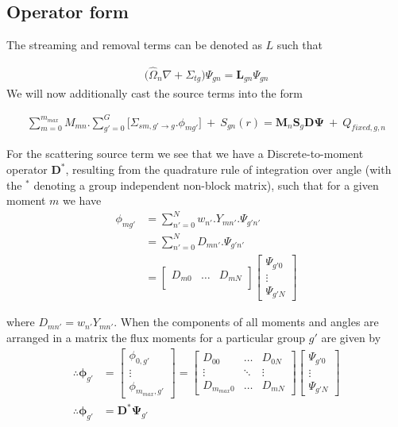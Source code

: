 \documentclass[11pt,letterpaper,titlepage]{article}
\numberwithin{equation}{section}
\begin{document}
\vspace{1.5cm}
\subsection{Operator form}
The streaming and removal terms can be denoted as $L$ such that

\begin{align*}
\biggr(\hat{\Omega}_n\nabla +\Sigma_{tg} \biggr)  \Psi_{gn}  = \mathbf{L}_{gn}\Psi_{gn} 
\end{align*}
\newline
We will now additionally cast the source terms into the form

\begin{align}
\sum_{m=0}^{m_{max}}     
M_{mn}
.
\sum_{g'=0}^{G}
\biggr[
\Sigma_{sm,g'{\to}g} 
. \phi_{mg'}
\biggr] \ 
+ \ S_{gn} (r) = \mathbf{M}_n \mathbf{S}_g \mathbf{D} \mathbf{\Psi} \ + \ Q_{fixed,g,n}
\end{align}

\noindent For the scattering source term we see that we have a Discrete-to-moment operator $\mathbf{D}^*$, resulting from the quadrature rule of integration over angle (with the $^*$ denoting a group independent non-block matrix), such that for a given moment $m$ we have
\begin{align*}
\phi_{mg'} &= 
\sum_{n'=0}^{N} w_{n'} . Y_{m n'}.\Psi_{g'n'} \\
&= \sum_{n'=0}^N D_{mn'}.\Psi_{g'n'} \\
&= 
\begin{bmatrix}
D_{m0} &\hdots  &D_{mN}\\
\end{bmatrix}
\begin{bmatrix}
\Psi_{g'0} \\
\vdots    \\
\Psi_{g'N}
\end{bmatrix}
\end{align*}

where $D_{mn'}=w_{n'}Y_{mn'}$.
When the components of all moments and angles are arranged in a matrix the flux moments for a particular group $g'$ are given by 
\begin{equation}
\begin{aligned}
\therefore
\boldsymbol{\phi}_{g'} &=  
\begin{bmatrix}
\phi_{0,g'} \\
\vdots \\
\phi_{m_{max},g'}
\end{bmatrix}=
\begin{bmatrix}
D_{00} &\hdots &D_{0N} \\
\vdots &\ddots &\vdots  \\
D_{m_{max}0} &\hdots &D_{mN}
\end{bmatrix}
\begin{bmatrix}
\Psi_{g'0} \\
\vdots    \\
\Psi_{g'N}
\end{bmatrix}\\
\therefore
\boldsymbol{\phi}_{g'}
&=\mathbf{D}^*\mathbf{\Psi}_{g'} 
\end{aligned}
\end{equation}
\end{document}
